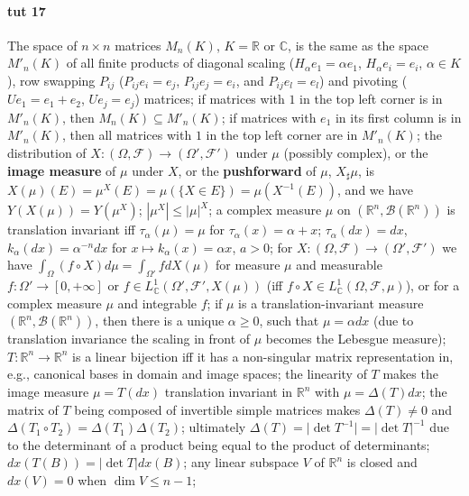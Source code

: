 \documentclass[a4paper]{article}
\newcommand{\Fcal}{\mathcal{F}}
\newcommand{\Bcal}{\mathcal{B}}
\newcommand{\real}{\mathbb{R}}
\newcommand{\cplx}{\mathbb{C}}
\begin{document}


\paragraph{tut 17} %
\label{par:tut_17}

The space of $n\times n$ matrices $M_n(K)$, $K = \real$ or $\cplx$, is the same as the space $M'_n(K)$ of all finite products of diagonal scaling ($H_\alpha e_1 = \alpha e_1$, $H_\alpha e_i = e_i$, $\alpha \in K$), row swapping $P_{ij}$ ($P_{ij} e_i = e_j$, $P_{ij} e_j = e_i$, and $P_{ij} e_l = e_l$) and pivoting ($U e_1 = e_1 + e_2$, $U e_j = e_j$) matrices;
if matrices with $1$ in the top left corner is in $M'_n(K)$, then $M_n(K)\subseteq M'_n(K)$;
if matrices with $e_1$ in its first column is in $M'_n(K)$, then all matrices with $1$ in the top left corner are in $M'_n(K)$;
the distribution of $X\colon (\Omega, \Fcal) \to (\Omega', \Fcal')$ under $\mu$ (possibly complex), or the {\bf image measure} of $\mu$ under $X$, or the {\bf pushforward} of $\mu$, $X_\sharp\mu$, is $X(\mu)(E) = \mu^X(E) = \mu(\{X \in E\}) = \mu(X^{-1}(E))$, and we have $Y(X(\mu)) = Y(\mu^X)$;
$|\mu^X| \leq |\mu|^X$;
a complex measure $\mu$ on $(\real^n, \Bcal(\real^n))$ is translation invariant iff $\tau_\alpha(\mu) = \mu$ for $\tau_\alpha(x) = \alpha + x$;
$\tau_\alpha(dx) = dx$, $k_\alpha(dx) = \alpha^{-n} dx$ for $x\mapsto k_\alpha(x) = \alpha x$, $a > 0$;
for $X\colon (\Omega, \Fcal) \to (\Omega', \Fcal')$ we have $\int_{\Omega} (f \circ X) d\mu = \int_{\Omega'} f dX(\mu)$ for measure $\mu$ and measurable $f\colon \Omega' \to [0, +\infty]$ or $f\in L^1_\cplx(\Omega', \Fcal', X(\mu))$ (iff $f\circ X \in L^1_\cplx(\Omega, \Fcal, \mu)$), or for a complex measure $\mu$ and integrable $f$;
if $\mu$ is a translation-invariant measure $(\real^n, \Bcal(\real^n))$, then there is a unique $\alpha \geq 0$, such that $\mu = \alpha dx$ (due to translation invariance the scaling in front of $\mu$ becomes the Lebesgue measure);
$T\colon \real^n \to \real^n$ is a linear bijection iff it has a non-singular matrix representation in, e.g., canonical bases in domain and image spaces;
the linearity of $T$ makes the image measure $\mu = T(dx)$ translation invariant in $\real^n$ with $\mu = \Delta(T) dx$;
the matrix of $T$ being composed of invertible simple matrices makes $\Delta(T) \neq 0$ and $\Delta(T_1 \circ T_2) = \Delta(T_1) \Delta(T_2)$;
ultimately $\Delta(T) = \lvert \det T^{-1} \rvert = \lvert \det T \rvert^{-1}$ due to the determinant of a product being equal to the product of determinants;
$dx(T(B)) = \lvert \det T\rvert dx(B)$;
any linear subspace $V$ of $\real^n$ is closed and $dx(V) = 0$ when $\dim V \leq n-1$;
\end{document}
